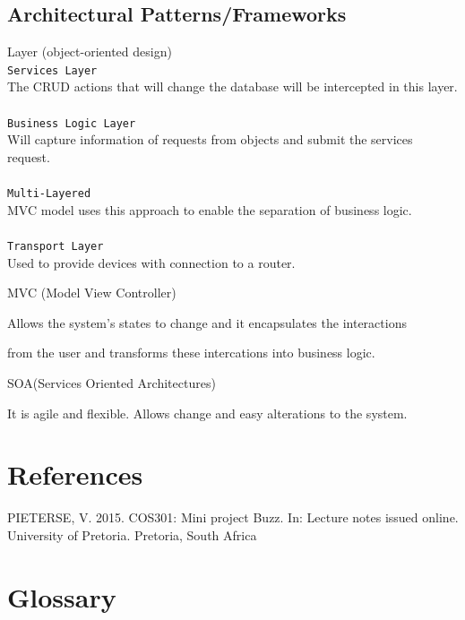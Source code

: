 \documentclass[a4paper,12pt]{report}
\begin{document}
\subsection{Architectural Patterns/Frameworks}
	\begin{description}
\item[$\bullet$] Layer (object-oriented design)\\
\texttt{Services Layer}\\
The CRUD actions that will change the database will be intercepted in this layer. \\ \\
\texttt{Business Logic Layer}\\
Will capture information of requests from objects and submit the services request.\\ \\
\texttt{Multi-Layered}\\
MVC model uses this approach to enable the separation of business logic.\\ \\
\texttt{Transport Layer}\\
Used to provide devices with connection to a router.
\item[$\bullet$] MVC (Model View Controller)
\item Allows the system's states to change and it encapsulates the interactions
\item from the user and transforms these intercations into business logic.
\item[$\bullet$] SOA(Services Oriented Architectures)
\item It is agile and flexible. Allows change and easy alterations to the system.
\end{description}
\section{References}
PIETERSE, V. 2015. COS301: Mini project Buzz. In: Lecture notes issued online. University of Pretoria. Pretoria, South Africa

\section{Glossary}
\end{document}
